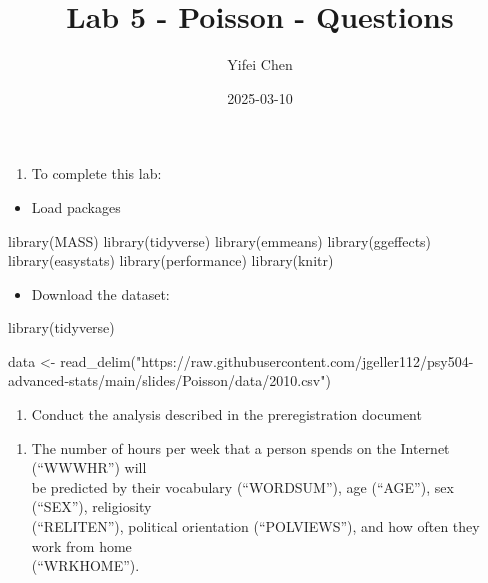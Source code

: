 \documentclass[
  letterpaper,
  DIV=11,
  numbers=noendperiod]{scrartcl}
\title{Lab 5 - Poisson - Questions}
\author{Yifei Chen}
\date{2025-03-10}
\newenvironment{Shaded}{\begin{snugshade}}{\end{snugshade}}
\newcommand{\FunctionTok}[1]{\textcolor[rgb]{0.28,0.35,0.67}{#1}}
\newcommand{\NormalTok}[1]{\textcolor[rgb]{0.00,0.23,0.31}{#1}}
\newcommand{\OtherTok}[1]{\textcolor[rgb]{0.00,0.23,0.31}{#1}}
\newcommand{\StringTok}[1]{\textcolor[rgb]{0.13,0.47,0.30}{#1}}
\providecommand{\tightlist}{%
  \setlength{\itemsep}{0pt}\setlength{\parskip}{0pt}}\usepackage{longtable,booktabs,array}
\begin{document}
\maketitle


\begin{enumerate}
\def\labelenumi{\arabic{enumi}.}
\tightlist
\item
  To complete this lab:
\end{enumerate}

\begin{itemize}
\tightlist
\item
  Load packages
\end{itemize}

\begin{Shaded}
\begin{Highlighting}[]
\FunctionTok{library}\NormalTok{(MASS)}
\FunctionTok{library}\NormalTok{(tidyverse)}
\FunctionTok{library}\NormalTok{(emmeans)}
\FunctionTok{library}\NormalTok{(ggeffects)}
\FunctionTok{library}\NormalTok{(easystats)}
\FunctionTok{library}\NormalTok{(performance)}
\FunctionTok{library}\NormalTok{(knitr)}
\end{Highlighting}
\end{Shaded}

\begin{itemize}
\tightlist
\item
  Download the dataset:
\end{itemize}

\begin{Shaded}
\begin{Highlighting}[]
\FunctionTok{library}\NormalTok{(tidyverse)}

\NormalTok{data }\OtherTok{\textless{}{-}} \FunctionTok{read\_delim}\NormalTok{(}\StringTok{"https://raw.githubusercontent.com/jgeller112/psy504{-}advanced{-}stats/main/slides/Poisson/data/2010.csv"}\NormalTok{)}
\end{Highlighting}
\end{Shaded}

\begin{enumerate}
\def\labelenumi{\arabic{enumi}.}
\setcounter{enumi}{1}
\tightlist
\item
  Conduct the analysis described in the preregistration document
\end{enumerate}

\begin{enumerate}
\def\labelenumi{\alph{enumi}.}
\tightlist
\item
  The number of hours per week that a person spends on the Internet
  (``WWWHR'') will\\
  be predicted by their vocabulary (``WORDSUM''), age (``AGE''), sex
  (``SEX''), religiosity\\
  (``RELITEN''), political orientation (``POLVIEWS''), and how often
  they work from home\\
  (``WRKHOME'').
\end{enumerate}
\end{document}
